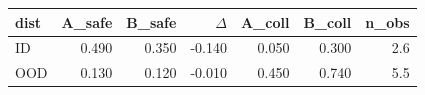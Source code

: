 \begin{tabular}{lrrrrrr}
\toprule
dist & A\_safe & B\_safe & $\Delta$ & A\_coll & B\_coll & n\_obs \\
\midrule
ID & 0.490 & 0.350 & -0.140 & 0.050 & 0.300 & 2.6 \\
OOD & 0.130 & 0.120 & -0.010 & 0.450 & 0.740 & 5.5 \\
\bottomrule
\end{tabular}
